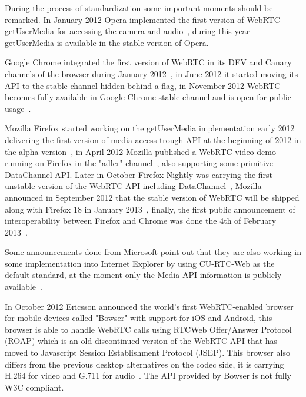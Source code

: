 During the process of standardization some important moments should be remarked. In January 2012 Opera implemented the first version of WebRTC getUserMedia for accessing the camera and audio~\cite{operaannouncement}, during this year getUserMedia is available in the stable version of Opera. 

Google Chrome integrated the first version of WebRTC in its DEV and Canary channels of the browser during January 2012~\cite{chromeannouncement}, in June 2012 it started moving its API to the stable channel hidden behind a flag, in November 2012 WebRTC becomes fully available in Google Chrome stable channel and is open for public usage~\cite{chromestable}. 

Mozilla Firefox started working on the getUserMedia implementation early 2012 delivering the first version of media access trough API at the beginning of 2012 in the alpha version~\cite{mozillablog}, in April 2012 Mozilla published a WebRTC video demo running on Firefox in the "adler" channel~\cite{mozillawebrtc}, also supporting some primitive DataChannel API. Later in October Firefox Nightly was carrying the first unstable version of the WebRTC API including DataChannel~\cite{mozillafinal}, Mozilla announced in September 2012 that the stable version of WebRTC will be shipped along with Firefox 18 in January 2013~\cite{mozillacomming}, finally, the first public announcement of interoperability between Firefox and Chrome was done the 4th of February 2013~\cite{chromefirefoxinterop}.

Some announcements done from Microsoft point out that they are also working in some implementation into Internet Explorer by using CU-RTC-Web as the default standard, at the moment only the Media API information is publicly available~\cite{microsoftcapture}.

In October 2012 Ericsson announced the world's first WebRTC-enabled browser for mobile devices called "Bowser" with support for iOS and Android, this browser is able to handle WebRTC calls using RTCWeb Offer/Answer Protocol (ROAP) which is an old discontinued version of the WebRTC API that has moved to Javascript Session Establishment Protocol (JSEP). This browser also differs from the previous desktop alternatives on the codec side, it is carrying H.264 for video and G.711 for audio~\cite{ericssonbowser}. The API provided by Bowser is not fully W3C compliant.


